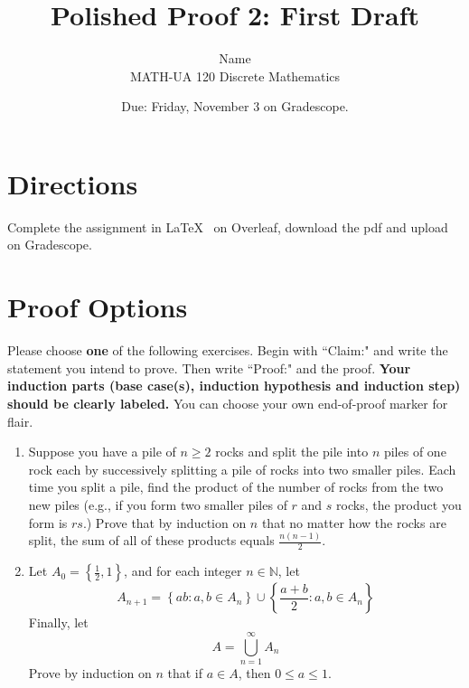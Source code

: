 \documentclass{article}
\title{Polished Proof 2: First Draft}
\author{%
	Name
	\\
	MATH-UA 120 Discrete Mathematics
}
\date{Due: Friday, November 3 on Gradescope.}
\theoremstyle{definition}
\begin{document}
	\maketitle
	
	\section*{Directions}

Complete the assignment in \LaTeX~  on Overleaf, download the pdf and upload on Gradescope.


\section*{Proof Options}

Please choose \textbf{one} of the following exercises. Begin with ``Claim:" and write the statement you intend to prove. Then write ``Proof:" and the proof. \textbf{Your induction parts (base case(s), induction hypothesis and induction step) should be clearly labeled.} You can choose your own end-of-proof marker for flair.

\begin{enumerate}
	\item 
    Suppose you have a pile of $n\geq 2$ rocks and split the pile into $n$ piles of one rock each by successively splitting a pile of rocks into two smaller piles. Each time you split a pile, find the product of the number of rocks from the two new piles (e.g., if you form two smaller piles of $r$ and $s$ rocks, the product you form is $rs$.) Prove that by induction on $n$ that no matter how the rocks are split, the sum of all of these products equals $\frac{n(n-1)}{2}$.

	\item
    Let $A_0 = \left\{\frac{1}{2},1\right\}$, and for each integer $n \in \mathbb{N}$, let 
    \[
        A_{n+1} = \left\{ab : a,b \in A_n\right\}
                    \cup \left\{\frac{a+b}{2} : a,b\in A_n \right\}
    \]
    Finally, let 
    \[
        A = \bigcup_{n=1}^\infty A_n
    \]
    Prove by induction on $n$ that if $a\in A$, then $0\leq a\leq 1$.

\end{enumerate}
\end{document}
